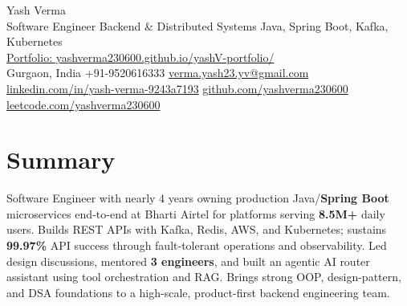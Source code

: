\documentclass[letterpaper,11pt]{article}
\begin{document}
\begin{center}
  {\Huge Yash Verma} \\
  \small Software Engineer \textbar{} Backend \& Distributed Systems \textbar{} Java, Spring Boot, Kafka, Kubernetes \\
  \href{https://yashverma230600.github.io/yashV-portfolio/}{Portfolio: yashverma230600.github.io/yashV-portfolio/} \\
  \vspace{8pt}
  \small
  Gurgaon, India \textbar{}
  +91-9520616333 \textbar{}
  \href{mailto:verma.yash23.yv@gmail.com}{verma.yash23.yv@gmail.com} \textbar{}
  \href{https://www.linkedin.com/in/yash-verma-9243a7193/}{linkedin.com/in/yash-verma-9243a7193} \textbar{}
  \href{https://github.com/yashverma230600}{github.com/yashverma230600} \textbar{}
  \href{https://leetcode.com/yashverma230600}{leetcode.com/yashverma230600}
  \vspace{-8pt}
\end{center}

\section{Summary}
\begin{itemize}[leftmargin=0.15in, label={}]
  \small{\item{
    Software Engineer with nearly 4 years owning production Java/\textbf{Spring Boot} microservices end-to-end at Bharti Airtel for platforms serving \textbf{8.5M+} daily users. Builds REST APIs with Kafka, Redis, AWS, and Kubernetes; sustains \textbf{99.97\%} API success through fault-tolerant operations and observability. Led design discussions, mentored \textbf{3 engineers}, and built an agentic AI router assistant using tool orchestration and RAG. Brings strong OOP, design-pattern, and DSA foundations to a high-scale, product-first backend engineering team.
  }}
\end{itemize}
\vspace{-8pt}

\end{document}
